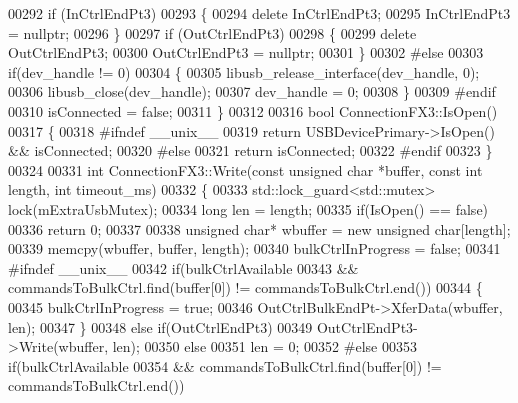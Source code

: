 \begin{DoxyCode}
{{00292     \textcolor{keywordflow}{if} (InCtrlEndPt3)
00293     \{
00294         \textcolor{keyword}{delete} InCtrlEndPt3;
00295         InCtrlEndPt3 = \textcolor{keyword}{nullptr};
00296     \}
00297     \textcolor{keywordflow}{if} (OutCtrlEndPt3)
00298     \{
00299         \textcolor{keyword}{delete} OutCtrlEndPt3;
00300         OutCtrlEndPt3 = \textcolor{keyword}{nullptr};
00301     \}
00302 \textcolor{preprocessor}{    #else}
00303     \textcolor{keywordflow}{if}(dev\_handle != 0)
00304     \{
00305         libusb\_release\_interface(dev\_handle, 0);
00306         libusb\_close(dev\_handle);
00307         dev\_handle = 0;
00308     \}
00309 \textcolor{preprocessor}{    #endif}
00310     isConnected = \textcolor{keyword}{false};
00311 \}
00312 
00316 \textcolor{keywordtype}{bool} ConnectionFX3::IsOpen()
00317 \{
00318 \textcolor{preprocessor}{    #ifndef \_\_unix\_\_}
00319     \textcolor{keywordflow}{return} USBDevicePrimary->IsOpen() && isConnected;
00320 \textcolor{preprocessor}{    #else}
00321     \textcolor{keywordflow}{return} isConnected;
00322 \textcolor{preprocessor}{    #endif}
00323 \}
00324 
00331 \textcolor{keywordtype}{int} ConnectionFX3::Write(\textcolor{keyword}{const} \textcolor{keywordtype}{unsigned} \textcolor{keywordtype}{char} *buffer, \textcolor{keyword}{const} \textcolor{keywordtype}{int} length, \textcolor{keywordtype}{int} 
      timeout_ms)
00332 \{
00333     std::lock\_guard<std::mutex> lock(mExtraUsbMutex);
00334     \textcolor{keywordtype}{long} len = length;
00335     \textcolor{keywordflow}{if}(IsOpen() == \textcolor{keyword}{false})
00336         \textcolor{keywordflow}{return} 0;
00337 
00338     \textcolor{keywordtype}{unsigned} \textcolor{keywordtype}{char}* wbuffer = \textcolor{keyword}{new} \textcolor{keywordtype}{unsigned} \textcolor{keywordtype}{char}[length];
00339     memcpy(wbuffer, buffer, length);
00340     bulkCtrlInProgress = \textcolor{keyword}{false};
00341 \textcolor{preprocessor}{    #ifndef \_\_unix\_\_}
00342     \textcolor{keywordflow}{if}(bulkCtrlAvailable
00343         && commandsToBulkCtrl.find(buffer[0]) != commandsToBulkCtrl.end())
00344     \{
00345         bulkCtrlInProgress = \textcolor{keyword}{true};
00346         OutCtrlBulkEndPt->XferData(wbuffer, len);
00347     \}
00348     \textcolor{keywordflow}{else} \textcolor{keywordflow}{if}(OutCtrlEndPt3)
00349         OutCtrlEndPt3->Write(wbuffer, len);
00350     \textcolor{keywordflow}{else}
00351         len = 0;
00352 \textcolor{preprocessor}{    #else}
00353     \textcolor{keywordflow}{if}(bulkCtrlAvailable
00354         && commandsToBulkCtrl.find(buffer[0]) != commandsToBulkCtrl.end())
}}
\end{DoxyCode}
